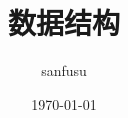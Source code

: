 \documentclass[UTF8]{ctexart}
\begin{document}
    \title{数据结构}
    \author{sanfusu}
    \date{\today}
    \maketitle
    
    
\end{document}

